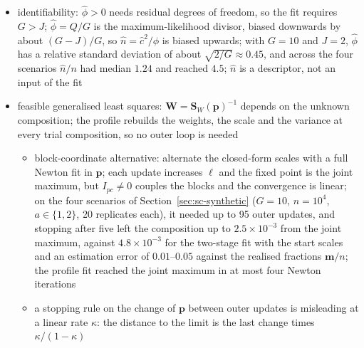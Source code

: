 \begin{itemize}
        quadratic programme of \emph{DeconRNASeq} \cite{gongDeconRNASeqStatisticalFramework2013} solved in the products
        \(w_{j}=c\,p_{j}\): non-negative least squares, solved exactly by enumerating the \(2^{J}-1\) active sets (\(J\le12\)); the
        sum-to-one constraint holds after dividing by the fitted total \(c^{(0)}=\mathbf{1}^{\top}\boldsymbol{w}\), because the free scale
        absorbs it; the equality constraint can be imposed directly only when \(c_{i}\) is known; \(\boldsymbol{p}^{(0)}\) is floored
        away from zero; \(\ell^{\ast}\) is not concave, so Dirichlet multistarts, as for the population model, remain advisable
  \item identifiability: \(\hat\phi>0\) needs residual degrees of freedom, so the fit requires \(G>J\); \(\hat\phi=Q/G\) is the
        maximum-likelihood divisor, biased downwards by about \((G-J)/G\), so \(\hat n=\hat c^{2}/\hat\phi\) is biased upwards; with
        \(G=10\) and \(J=2\), \(\hat\phi\) has a relative standard deviation of about \(\sqrt{2/G}\approx0.45\), and across the four
        scenarios \(\hat n/n\) had median \(1.24\) and reached \(4.5\); \(\hat n\) is a descriptor, not an input of the fit
  \item feasible generalised least squares: \(\boldsymbol{W}=\boldsymbol{S}_{W}(\boldsymbol{p})^{-1}\) depends on the unknown composition; the profile
        rebuilds the weights, the scale and the variance at every trial composition, so no outer loop is needed
  \begin{itemize}
    \item block-coordinate alternative: alternate the closed-form scales with a full Newton fit in \(\boldsymbol{p}\); each
          update increases \(\ell\) and the fixed point is the joint maximum, but \(I_{pc}\neq0\) couples the blocks and the
          convergence is linear; on the four scenarios of Section~\ref{sec:sc-synthetic} (\(G=10\), \(n=10^{4}\), \(a\in\{1,2\}\),
          20 replicates each), it needed up to 95 outer updates, and stopping after five left the composition up to
          \(2.5\times10^{-3}\) from the joint maximum, against \(4.8\times10^{-3}\) for the two-stage fit with the start scales and an
          estimation error of \(0.01\)--\(0.05\) against the realised fractions \(\boldsymbol{m}/n\); the profile fit reached the joint maximum in at most four Newton iterations
    \item a stopping rule on the change of \(\boldsymbol{p}\) between outer updates is misleading at a linear rate \(\kappa\): the
          distance to the limit is the last change times \(\kappa/(1-\kappa)\)

\end{itemize}
\end{itemize}
